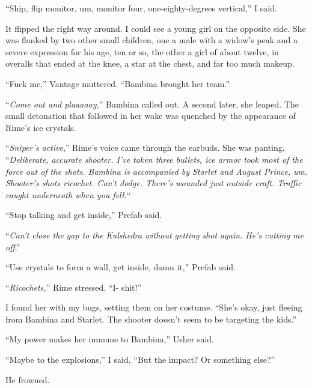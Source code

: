 ``Ship, flip monitor, um, monitor four, one-eighty-degrees vertical,'' I said.



It flipped the right way around.  I could see a young girl on the opposite side.  She was flanked by two other small children, one a male with a widow's peak and a severe expression for his age, ten or so, the other a girl of about twelve, in overalls that ended at the knee, a star at the chest, and far too much makeup.



``Fuck me,'' Vantage muttered.  ``Bambina brought her team.''



``\emph{Come out and plaaaaay,}'' Bambina called out.  A second later, she leaped.  The small detonation that followed in her wake was quenched by the appearance of Rime's ice crystals.



``\emph{Sniper's active},'' Rime's voice came through the earbuds.  She was panting.  ``\emph{Deliberate, accurate shooter.  I've taken three bullets, ice armor took most of the force out of the shots.  Bambina is accompanied by Starlet and August Prince, um.  Shooter's shots ricochet.  Can't dodge.  There's wounded just outside craft.  Traffic caught underneath when you fell.}``



``Stop talking and get inside,'' Prefab said.



 ``\emph{Can't close the gap to the Kulshedra without getting shot again.  He's cutting me off}.''



``Use crystals to form a wall, get inside, damn it,'' Prefab said.



``\emph{Ricochets,}'' Rime stressed.  ``I- shit!''



I found her with my bugs, setting them on her costume.  ``She's okay, just fleeing from Bambina and Starlet.  The shooter doesn't seem to be targeting the kids.''



``My power makes her immune to Bambina,'' Usher said.



``Maybe to the explosions,'' I said, ``But the impact?  Or something else?''



He frowned.



